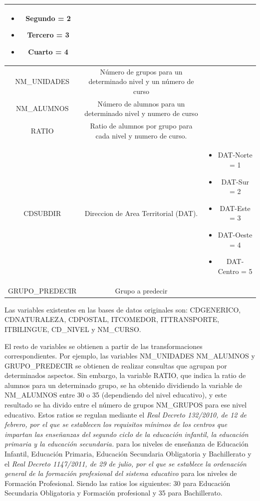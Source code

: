 \begin{subappendices}
\begin{table}[!ht]
{\begin{tabular}{|c|c|c|}
\begin{minipage}[t]{0.4\textwidth}
\begin{itemize}
					\item Segundo = 2
					\item Tercero = 3
					\item Cuarto = 4
				\end{itemize}
			\end{minipage}\\ 
			\hline 
			NM\_UNIDADES & Número de grupos para un determinado nivel y un número de curso &  \\ 
			\hline 
			NM\_ALUMNOS & Número de alumnos para un determinado nivel y numero de curso &  \\ 
			\hline 
			RATIO & Ratio de alumnos por grupo para cada nivel y numero de curso. &  \\ 
			\hline 
			CDSUBDIR & Direccion de Area Territorial (DAT). &  			\begin{minipage}[t]{0.4\textwidth}
				\begin{itemize}
					\item DAT-Norte = 1
					\item DAT-Sur = 2
					\item DAT-Este = 3
					\item DAT-Oeste = 4
					\item DAT-Centro = 5
				\end{itemize}
			\end{minipage}\\ 
			\hline 
			GRUPO\_PREDECIR & Grupo a predecir  &  \\ 
			\hline 
	\end{tabular}}
	
	\label{tab:TablaVariables}
\end{table}

Las variables existentes en las bases de datos originales son: CDGENERICO, CDNATURALEZA, CDPOSTAL, ITCOMEDOR, ITTRANSPORTE, ITBILINGUE, CD\_NIVEL y NM\_CURSO.

El resto de variables se obtienen a partir de las transformaciones correspondientes. Por ejemplo, las variables NM\_UNIDADES NM\_ALUMNOS y GRUPO\_PREDECIR se obtienen de realizar consultas que agrupan por determinados aspectos. Sin embargo, la variable RATIO, que indica la ratio de alumnos para un determinado grupo, se ha obtenido dividiendo la variable de NM\_ALUMNOS entre 30 o 35 (dependiendo del nivel educativo), y este resultado se ha divido entre el número de grupos NM\_GRUPOS para ese nivel educativo. Estos ratios se regulan mediante el \textit{Real Decreto 132/2010, de 12 de febrero, por el que se establecen los requisitos mínimos de los centros que impartan las enseñanzas del segundo ciclo de la educación infantil, la educación primaria y la educación secundaria.} para los niveles de enseñanza de Educación Infantil, Educación Primaria, Educación Secundaria Obligatoria y Bachillerato y el \textit{Real Decreto 1147/2011, de 29 de julio, por el que se establece la ordenación general de la formación profesional del sistema educativo} para los niveles de Formación Profesional. Siendo las ratios los siguientes: 30 para Educación Secundaria Obligatoria y Formación profesional y 35 para Bachillerato.


\end{subappendices}
